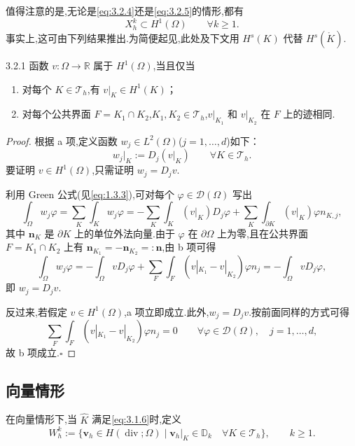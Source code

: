 值得注意的是,无论是\eqref{eq:3.2.4}还是\eqref{eq:3.2.5}的情形,都有
\[
  X_h^k\subset H^1(\Omega)\qquad \forall k\ge1.
\]
事实上,这可由下列结果推出.为简便起见,此处及下文用 \(H^s(K)\) 代替 \(H^s(\mathring K)\).

\begin{proposition}[]{3.2.1}
函数 \(v\colon\Omega\to\mathbb R\) 属于 \(H^1(\Omega)\),当且仅当
\begin{enumerate}[label=\alph*.,leftmargin=*]
  \item 对每个 \(K\in\mathcal T_h\),有 \(v|_K\in H^1(K)\)；
  \item 对每个公共界面 \(F=K_1\cap K_2\),\(K_1,K_2\in\mathcal T_h\),\(v|_{K_1}\) 和 \(v|_{K_2}\) 在 \(F\) 上的迹相同.
\end{enumerate}
\end{proposition}

\begin{proof}
根据 a 项,定义函数 \(w_j\in L^2(\Omega)\)(\(j=1,\ldots,d\))如下：
\[
  w_j|_K:=D_j(v|_K)\qquad\forall K\in\mathcal T_h.
\]
要证明 \(v\in H^1(\Omega)\),只需证明 \(w_j=D_jv\).

利用 Green 公式(见\eqref{eq:1.3.3}),可对每个 \(\varphi\in\mathcal D(\Omega)\) 写出
\[
  \int_\Omega w_j\varphi
   =\sum_K\int_K w_j\varphi
   =-\sum_K\int_K(v|_K)D_j\varphi
    +\sum_K\int_{\partial K}(v|_K)\varphi n_{K,j},
\]
其中 \(\boldsymbol{n}_K\) 是 \(\partial K\) 上的单位外法向量.由于 \(\varphi\) 在 \(\partial\Omega\) 上为零,且在公共界面 \(F=K_1\cap K_2\) 上有 \(\boldsymbol{n}_{K_1}=-\boldsymbol{n}_{K_2}=:\boldsymbol{n}\),由 b 项可得
\[
  \int_\Omega w_j\varphi=-\int_\Omega vD_j\varphi
     +\sum_F\int_F(v|_{K_1}-v|_{K_2})\varphi n_j
     =-\int_\Omega vD_j\varphi,
\]
即 \(w_j=D_jv\).

反过来,若假定 \(v\in H^1(\Omega)\),a 项立即成立.此外,\(w_j=D_jv\).按前面同样的方式可得
\[
  \sum_F\int_F(v|_{K_1}-v|_{K_2})\varphi n_j=0
    \qquad \forall\varphi\in\mathcal D(\Omega),\quad j=1,\ldots,d,
\]
故 b 项成立.\hfill\(\square\)
\end{proof}

\subsection{向量情形}\label{sec:3.2.2}

\begin{definition*}[向量有限元空间]
在向量情形下,当 \(\widehat K\) 满足\eqref{eq:3.1.6}时,定义
\begin{equation}\label{eq:3.2.6}
  W_h^k:=\bigl\{\boldsymbol{v}_h\in H(\operatorname{div};\Omega)\mid
   \boldsymbol{v}_h|_K\in\mathbb D_k\quad\forall K\in\mathcal T_h\bigr\},
   \qquad k\ge1.
\end{equation}
\end{definition*}

